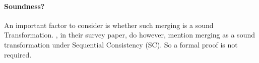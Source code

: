 
    \paragraph*{Soundness?}

        An important factor to consider is whether such merging is a sound Transformation. 
        \cite{DBLP:journals/pcs/MoiseenkoPK21}, in their survey paper, do however, mention merging as a sound transformation under Sequential Consistency (SC).
        So a formal proof is not required.
 


